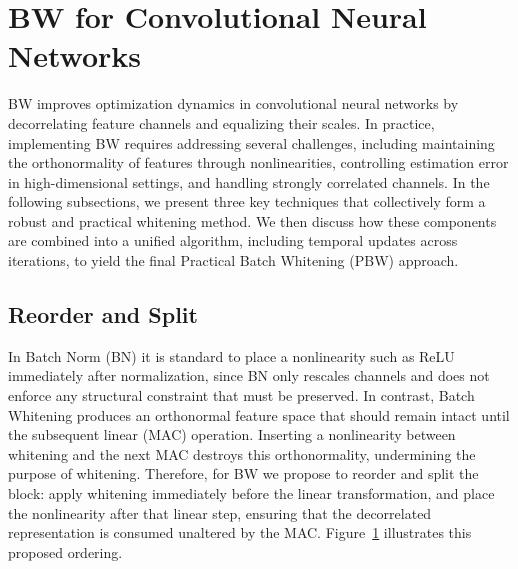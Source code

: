\section{BW for Convolutional Neural Networks}
\label{sec:bw_for_vision}

BW improves optimization dynamics in convolutional neural networks by decorrelating feature channels and equalizing their scales.  
In practice, implementing BW requires addressing several challenges, including maintaining the orthonormality of features through nonlinearities, controlling estimation error in high-dimensional settings, and handling strongly correlated channels.  
In the following subsections, we present three key techniques that collectively form a robust and practical whitening method.  
We then discuss how these components are combined into a unified algorithm, including temporal updates across iterations, to yield the final Practical Batch Whitening (PBW) approach.


%
%
%
%

\subsection{Reorder and Split}

In Batch Norm (BN) it is standard to place a nonlinearity such as ReLU immediately after normalization, since BN only rescales channels and does not enforce any structural constraint that must be preserved.
In contrast, Batch Whitening produces an orthonormal feature space that should remain intact until the subsequent linear (MAC) operation.
Inserting a nonlinearity between whitening and the next MAC destroys this orthonormality, undermining the purpose of whitening.
Therefore, for BW we propose to reorder and split the block: apply whitening immediately before the linear transformation, and place the nonlinearity after that linear step, ensuring that the decorrelated representation is consumed unaltered by the MAC.
Figure~\ref{fig:bw_reorder_and_split} illustrates this proposed ordering.


\begin{figure}
    \centering
    \resizebox{1.0\columnwidth}{!}{%
    }
    \caption{}
    \label{fig:bw_reorder_and_split}
\end{figure}

